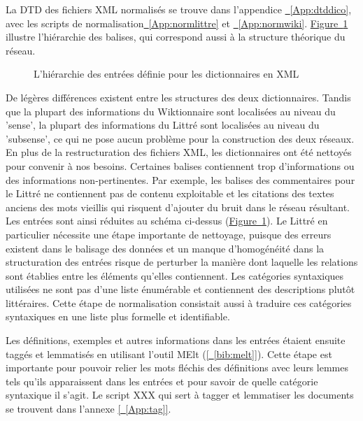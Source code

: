 \documentclass[a4paper, 12pt]{article}
\begin{document}
La DTD des fichiers XML normalisés se trouve dans l'appendice \hyperref[App:dtddico]{~\ref*{App:dtddico}}, avec les scripts de normalisation\hyperref[App:normlittre]{~\ref*{App:normlittre}} et \hyperref[App:normwiki]{~\ref*{App:normwiki}}.
\hyperref[fig:XMLhierarchy]{Figure~\ref*{fig:XMLhierarchy}}  illustre l'hiérarchie des balises, qui correspond aussi à la structure théorique du réseau.

\begin{figure}[!ht]
\centering
\def\svgwidth{\columnwidth}

\caption{L'hiérarchie des entrées définie pour les dictionnaires en XML}
\label{fig:XMLhierarchy}
\end{figure}


De légères différences existent entre les structures des deux dictionnaires. Tandis que la plupart des informations du Wiktionnaire sont localisées au niveau du 'sense', la plupart des informations du Littré sont localisées au niveau du 'subsense', ce qui ne pose aucun problème pour la construction des deux réseaux.
\newline
\newline
En plus de la restructuration des fichiers XML, les dictionnaires ont été nettoyés pour convenir à nos besoins. Certaines balises contiennent trop d'informations ou des informations non-pertinentes. Par exemple, les balises des commentaires pour le Littré ne contiennent pas de contenu exploitable et les citations des textes anciens des mots vieillis qui risquent d'ajouter du bruit dans le réseau résultant. Les entrées sont ainsi réduites au schéma ci-dessus (\hyperref[fig:XMLhierarchy]{Figure~\ref*{fig:XMLhierarchy}}). Le Littré en particulier nécessite une étape importante de nettoyage, puisque des erreurs existent dans le balisage des données et un manque d'homogénéité dans la structuration des entrées risque de perturber la manière dont laquelle les relations sont établies entre les éléments qu'elles contiennent. Les catégories syntaxiques utilisées ne sont pas d'une liste énumérable et contiennent des descriptions plutôt littéraires. Cette étape de normalisation consistait aussi à traduire ces catégories syntaxiques en une liste plus formelle et identifiable.

Les définitions, exemples et autres informations dans les entrées étaient ensuite taggés et lemmatisés en utilisant l'outil MElt (\hyperref[bib:melt]{[~\ref*{bib:melt}]}). Cette étape est importante pour pouvoir relier les mots fléchis des définitions avec leurs lemmes tels qu'ils apparaissent dans les entrées et pour savoir de quelle catégorie syntaxique il s'agit. Le script XXX qui sert à tagger et lemmatiser les documents se trouvent dans l'annexe \hyperref[App:tag]{[~\ref*{App:tag}]}.
\end{document}
